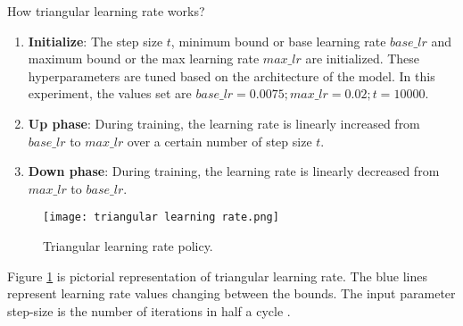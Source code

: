 How triangular learning rate works?
\begin{enumerate}
    \item \textbf{Initialize}: The step size $ t $, minimum bound or base learning rate $ base\_lr$ and maximum bound or the max learning rate  $max\_lr$ are initialized. These hyperparameters are tuned based on the architecture of the model. In this experiment, the values set are  $ base\_lr=0.0075 ; max\_lr=0.02; t=10000$.
    \item  \textbf{Up phase}: During training, the learning rate is linearly increased from $ base\_lr$ to $max\_lr$ over a certain number of step size $ t $.
    \item \textbf{Down phase}: During training, the learning rate is linearly decreased from $max\_lr$ to $base\_lr$.
\end{enumerate}

\begin{figure}[H]
    \centering    
    \texttt{[image: triangular learning rate.png]}
    \caption{Triangular learning rate policy.  \parencite{Smith.03062015}
    }
    \label{fig:trl}
\end{figure}
 Figure \ref{fig:trl} is pictorial representation of triangular learning rate. The blue lines represent learning rate values changing between the bounds. The input parameter step-size is the number of iterations in half a cycle \parencite{Smith.03062015}.

